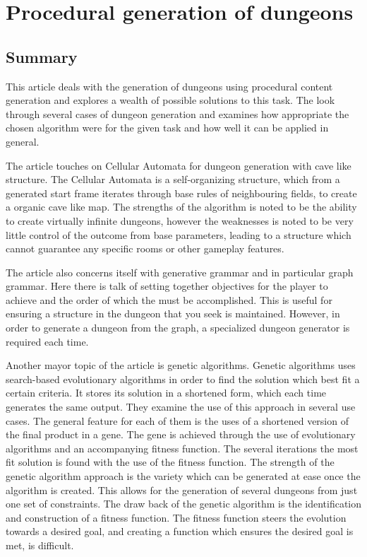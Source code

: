 \documentclass[a4paper,11pt]{article}
\begin{document}
\section{Procedural generation of dungeons}
\subsection{Summary}
This article\cite{dungeon} deals with the generation of dungeons using procedural content generation and explores a wealth of possible solutions to this task.
The look through several cases of dungeon generation and examines how appropriate the chosen algorithm were for the given task and how well it can be applied in general. 

The article touches on Cellular Automata for dungeon generation with cave like structure. The Cellular Automata is a self-organizing structure, which from a generated start frame iterates through base rules of neighbouring fields, to create a organic cave like map. The strengths of the algorithm is noted to be the ability to create virtually infinite dungeons, however the weaknesses is noted to be very little control of the outcome from base parameters, leading to a structure which cannot guarantee any specific rooms or other gameplay features.

The article also concerns itself with generative grammar and in particular graph grammar. Here there is talk of setting together objectives for the player to achieve and the order of which the must be accomplished. This is useful for ensuring a structure in the dungeon that you seek is maintained. However, in order to generate a dungeon from the graph, a specialized dungeon generator is required each time. 

Another mayor topic of the article is genetic algorithms. Genetic algorithms uses search-based evolutionary algorithms in order to find the solution which best fit a certain criteria. It stores its solution in a shortened form, which each time generates the same output. 
They examine the use of this approach in several use cases. The general feature for each of them is the uses of a shortened version of the final product in a gene. The gene is achieved through the use of evolutionary algorithms and an accompanying fitness function. The several iterations the most fit solution is found with the use of the fitness function. 
The strength of the genetic algorithm approach is the variety which can be generated at ease once the algorithm is created. This allows for the generation of several dungeons from just one set of constraints. The draw back of the genetic algorithm is the identification and construction of a fitness function. The fitness function steers the evolution towards a desired goal, and creating a function which ensures the desired goal is met, is difficult. 
\end{document}

